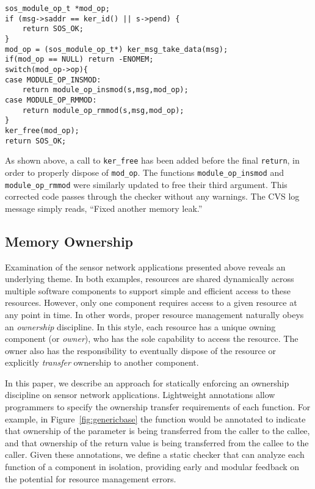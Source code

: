 \begin{scriptsize}
\begin{verbatim}
sos_module_op_t *mod_op;
if (msg->saddr == ker_id() || s->pend) {
    return SOS_OK;
}
mod_op = (sos_module_op_t*) ker_msg_take_data(msg);
if(mod_op == NULL) return -ENOMEM;
switch(mod_op->op){
case MODULE_OP_INSMOD:
    return module_op_insmod(s,msg,mod_op);
case MODULE_OP_RMMOD:
    return module_op_rmmod(s,msg,mod_op);
}
ker_free(mod_op);
return SOS_OK;
\end{verbatim}
\end{scriptsize}



As shown above, a call to {\tt ker\_free} has been added before the final
{\tt return}, in order to properly dispose of {\tt mod\_op}.
%
The functions {\tt module\_op\_insmod} and {\tt module\_op\_rmmod} were
similarly updated to free their third argument.  
%
This corrected code passes through the checker without any warnings.  
%
The CVS log message simply reads, ``Fixed another memory leak.''  



\subsection{Memory Ownership}
\label{subsec:owner}

Examination of the sensor network applications presented above reveals an
underlying theme.  
%
In both examples, resources are shared dynamically across multiple software
components to support simple and efficient access to these resources.  
%
However, only one component requires access to a given resource at any point
in time.  
%
In other words, proper resource management naturally obeys an {\em
ownership} discipline.  
%
In this style, each resource has a unique owning component (or {\em owner}),
who has the sole capability to access the resource.  
%
The owner also has the responsibility to eventually dispose of the resource
or explicitly {\em transfer} ownership to another component.



In this paper, we describe an approach for statically enforcing an ownership
discipline on sensor network applications.  
%
Lightweight annotations allow programmers to specify the ownership transfer
requirements of each function.  
%
For example, in Figure~\ref{fig:genericbase} the  function
would be annotated to indicate that ownership of the 
parameter is being transferred from the caller to the callee, and that
ownership of the return value is being transferred from the callee to the
caller.  
%
Given these annotations, we define a static checker that can analyze each
function of a component in isolation, providing early and modular feedback
on the potential for resource management errors.



